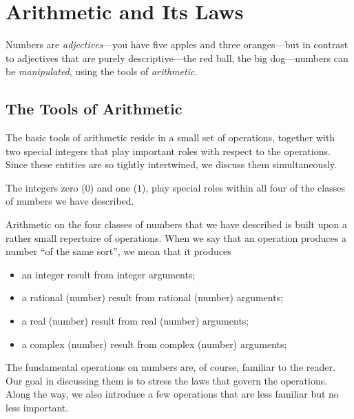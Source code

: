 \section{Arithmetic and Its Laws}
\label{sec:Arithmetic-Tools+Laws}

Numbers are {\it adjectives}---you have
five apples and three oranges---but in contrast to adjectives that are
purely descriptive---the red ball, the big dog---numbers can be {\em
  manipulated}, using the
tools of {\it arithmetic}.

\subsection{The Tools of Arithmetic}
\label{sec:arithmetic-tools}

The basic tools of arithmetic reside in a small set of operations,
together with two special integers that play important roles with
respect to the operations.  Since these entities are so tightly
intertwined, we discuss them simultaneously.

\smallskip

%
The integers zero ($0$) and one
($1$), play special roles within all four of
the classes of numbers we have described.

\smallskip

%
Arithmetic on the four classes of numbers that we have described is
built upon a rather small repertoire of operations.  When we say that
an operation produces a number ``of the same sort'', we mean that it
produces
\begin{itemize}
\item
an integer result from integer arguments;
\item
a rational (number) result from rational (number) arguments;
\item
a real (number) result from real (number) arguments;
\item
a complex (number) result from complex (number) arguments;
\end{itemize}
The fundamental operations on numbers are, of course, familiar to the
reader.  Our goal in discussing them is to stress the laws that govern
the operations.  Along the way, we also introduce a few operations
that are less familiar but no less important.

